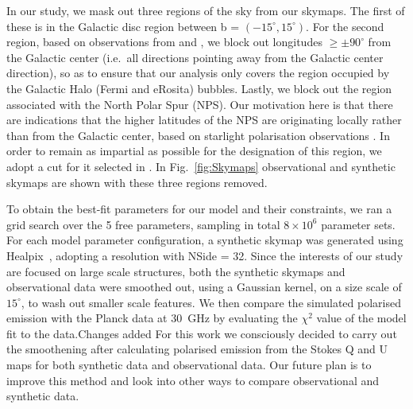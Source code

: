 \documentclass[usenatbib]{mnras}
\newcommand{\Vasu}[1]{{\color{purple}#1}}
\begin{document}
In our study, we mask out three regions of the sky from our skymaps. The first of these is in the Galactic disc region between b = $(-15^{\circ},15^{\circ})$. For the second region, based on observations from \cite{Su_2010} and \cite{eROSITA}, we block out longitudes  $\geq \pm 90^{\circ}$ from the Galactic center (i.e.~all directions pointing away from the Galactic center direction), so as to ensure that our analysis only covers the region occupied by the Galactic Halo (Fermi and eRosita) bubbles. Lastly, we block out the region associated with the North Polar Spur (NPS). Our motivation here is that there are indications that the higher latitudes of the NPS are originating locally rather than from the Galactic center, based on starlight polarisation observations \citep{Gina_2021}. In order to remain as impartial as possible for the designation of this region, we adopt a cut for it selected in \cite{Wolleben_2007}. In Fig.~\ref{fig:Skymaps} observational and synthetic skymaps are shown with these three regions removed.


To obtain the best-fit parameters for our model and their constraints, we ran a grid search over the 5 free parameters, sampling in total $8\times 10^{6}$ parameter sets. For each model parameter configuration, a synthetic skymap was generated using Healpix~\citep{Healpix_2005}, adopting a resolution with NSide = 32. Since the interests of our study are focused on large scale structures, both the synthetic skymaps and observational data were smoothed out, using a Gaussian kernel, on a size scale of $15^{\circ}$, to wash out smaller scale features. We then compare the simulated polarised emission with the Planck data at 30~GHz by evaluating the $\chi^{2}$ value of the model fit to the data.\Vasu{Changes added}
For this work we consciously decided to carry out the smoothening after calculating polarised emission from the Stokes Q and U maps for both synthetic data and observational data. Our future plan is to improve this method and look into other ways to compare observational and synthetic data.
\end{document}
